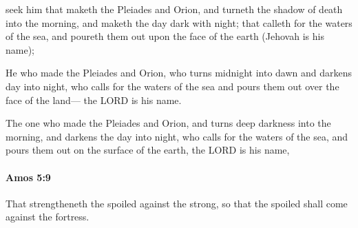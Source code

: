 			\begin{versebox}
					\item[BHS] 
					\item[LXX] 
					\item[ASV] seek him that maketh the Pleiades and Orion, and turneth the shadow of death into the morning, and maketh the day dark with night; that calleth for the waters of the sea, and poureth them out upon the face of the earth (Jehovah is his name);
					\item[NIV] He who made the Pleiades and Orion, who turns midnight into dawn and darkens day into night, who calls for the waters of the sea and pours them out over the face of the land— the LORD is his name.
					\item[NRSV] The one who made the Pleiades and Orion, and turns deep darkness into the morning, and darkens the day into night, who calls for the waters of the sea, and pours them out on the surface of the earth, the LORD is his name,
			\end{versebox}

		\paragraph{Amos 5:9} %
			\label{AMOS-5-9}

			That strengtheneth the spoiled against the strong, so that the spoiled shall come against the fortress.

